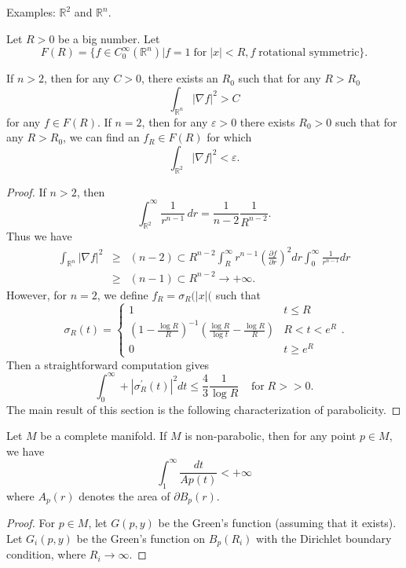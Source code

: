 \noindent Examples: $ \mathbb{R}^2 $ and $ \mathbb{R}^n $.

Let $ R > 0 $ be a big number. Let 
\[F(R) = \{ f \in C^\infty _0 (\mathbb{R}^n) | f = 1 \; \mbox{for}\; |x| < R, f \; \mbox{rotational symmetric} \}.\]

If $n > 2 $, then for any $ C > 0 $, there exists an $R_0$ such that for any $ R > R_0 $
%
\[ \int_{\mathbb{R}^n}|\nabla f | ^2 > C \]
%
for any $ f \in F(R) $. If $ n = 2 $, then for any $ \varepsilon > 0 $ there exists $ R_0 > 0 $ such that for any $ R> R_0 $, we can find an $ f_R \in F(R) $ for which 
%
\[ \int_{\mathbb{R}^2} | \nabla f|^2 < 
\varepsilon.\]

\begin{proof} If $ n > 2 $, then 
%
\[ \int ^\infty_{\mathbb{R}^2} \frac{1}{r^{n-1}} \, d r = \frac{1}{n-2} \frac{1}{R^{n-2}}.\]
Thus we have 
\begin{eqnarray*}
\int_{\mathbb{R}^n} | \nabla f|^2 &\geq &(n-2) \subset R^{n-2} \int ^\infty_R r ^{n-1} \left( \frac{\partial f}{\partial r} \right)^2 dr \int^\infty_0 \frac{1}{r^{n-1}} dr \\
& \geq& (n-1) \subset R^{n-2} \rightarrow + \infty .
\end{eqnarray*}
However, for $ n = 2$, we define $ f_R = \sigma _R (|x|( $ such that 
%
\[ \sigma _R (t) = \left\{ \begin{array} {ll} 1 & t \leq R\\
\left( 1 - \frac{\log R}{R}\right) ^{-1} \left( \frac{\log R}{\log t} - \frac{\log R}{R} \right) & R < t < e ^R\\
0 & t \geq e^R 
\end{array} \right. .\]
%
Then a straightforward computation gives
%
\[\int^\infty_0 + | \sigma ^\prime _R (t) |^2 dt \leq \frac{4}{3} \frac{1}{\log R} \; \;\;\; \mbox{for}\; R >>0 .\]
The main result of this section is the following characterization of parabolicity.
\end{proof}

\begin{theorem} Let $M$ be a complete manifold. If $ M$ is non-parabolic, then for any point $ p \in M$, we have 
%
\[ \int^\infty_1 \frac{dt}{Ap(t)} < + \infty\]
%
where $ A_p (r) $ denotes the area of $ \partial B_p (r) $.
\end{theorem}

\begin{proof} For $ p\in M $, let $ G(p, y) $ be the Green's function (assuming that it exists). Let $ G_i (p, y) $ be the Green's function on $ B_p (R_i) $ with the Dirichlet boundary condition, where $ R_i \rightarrow   \infty $.
\end{proof}

